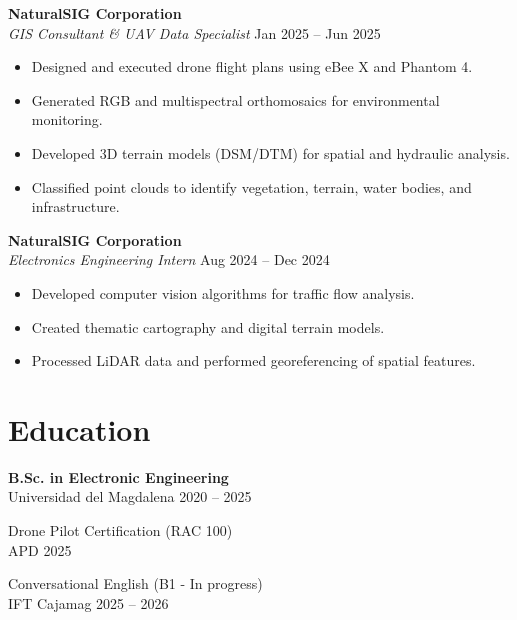 \documentclass[10pt,a4paper]{article}
\begin{document}
\vspace{2mm}

\textbf{NaturalSIG Corporation} \\
\textit{GIS Consultant \& UAV Data Specialist} \hfill Jan 2025 -- Jun 2025
\begin{itemize}[noitemsep]
    \item Designed and executed drone flight plans using eBee X and Phantom 4.
    \item Generated RGB and multispectral orthomosaics for environmental monitoring.
    \item Developed 3D terrain models (DSM/DTM) for spatial and hydraulic analysis.
    \item Classified point clouds to identify vegetation, terrain, water bodies, and infrastructure.
\end{itemize}

\vspace{2mm}

\textbf{NaturalSIG Corporation} \\
\textit{Electronics Engineering Intern} \hfill Aug 2024 -- Dec 2024
\begin{itemize}[noitemsep]
    \item Developed computer vision algorithms for traffic flow analysis.
    \item Created thematic cartography and digital terrain models.
    \item Processed LiDAR data and performed georeferencing of spatial features.
\end{itemize}

\vspace{3mm}

\section*{Education}

\textbf{B.Sc. in Electronic Engineering} \\
Universidad del Magdalena \hfill 2020 -- 2025

\vspace{2mm}

Drone Pilot Certification (RAC 100) \\
APD \hfill 2025

\vspace{2mm}

Conversational English (B1 - In progress) \\
IFT Cajamag \hfill 2025 -- 2026
\end{document}
